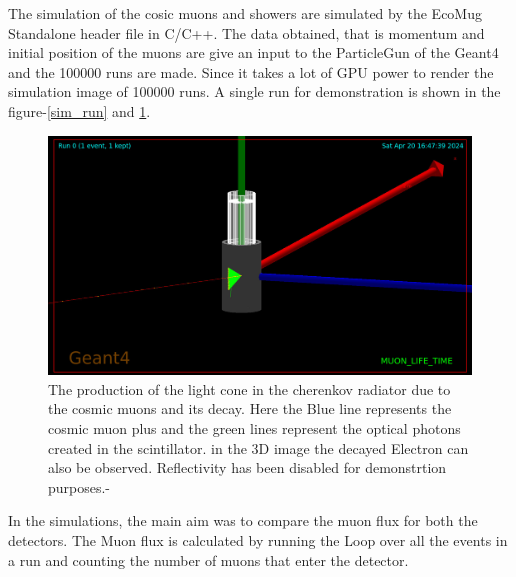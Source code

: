 \documentclass{article}
\begin{document}
\begin{multicols}{2}
The simulation of the cosic muons and showers are simulated by the EcoMug Standalone header file in C/C++. The data obtained, that is momentum and initial position of the muons are give an input to the ParticleGun of the Geant4 and the 100000 runs are made. Since it takes a lot of GPU power to render the simulation image of 100000 runs. A single run for demonstration is shown in the figure-\ref{sim_run} and \ref{sim_cher}.

\begin{figure}[H]
    \centering
    \includegraphics[width = \columnwidth]{Images/cher_sim_2.jpeg}
    \caption{The production of the light cone in the cherenkov radiator due to the cosmic muons and its decay. Here the Blue line represents the cosmic muon plus and the green lines represent the optical photons created in the scintillator. in the 3D image the decayed Electron can also be observed. Reflectivity has been disabled for demonstrtion purposes.-\cite{agostinelli2003geant4} }
    \label{sim_cher}
\end{figure}




In the simulations, the main aim was to compare the muon flux for both the detectors. 
The Muon flux is calculated by running the Loop over all the events in a run and counting the number of muons that enter the detector.




\end{multicols}
\end{document}
